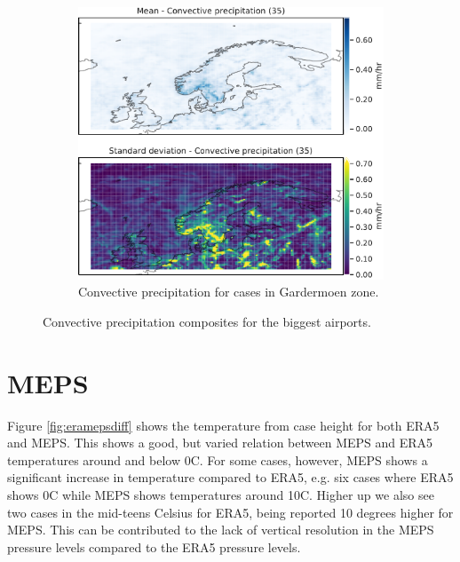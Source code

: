 \begin{figure}
    \begin{subfigure}[b]{0.5\textwidth}
    \centering
    \includegraphics[width=\textwidth]{Figures/cPENGM.pdf}
    \caption{Convective precipitation for cases in Gardermoen zone.}
    \label{fig:ENGMcP}
\end{subfigure}
\caption{Convective precipitation composites for the biggest airports. }
\label{fig:convectiveairports}
\end{figure}


\section{MEPS}
Figure \ref{fig:eramepsdiff} shows the temperature from case height for both ERA5 and MEPS. This shows a good, but varied relation between MEPS and ERA5 temperatures around and below 0C. For some cases, however, MEPS shows a significant increase in temperature compared to ERA5, e.g. six cases where ERA5 shows 0C while MEPS shows temperatures around 10C. Higher up we also see two cases in the mid-teens Celsius for ERA5, being reported 10 degrees higher for MEPS. This can be contributed to the lack of vertical resolution in the MEPS pressure levels compared to the ERA5 pressure levels. 



